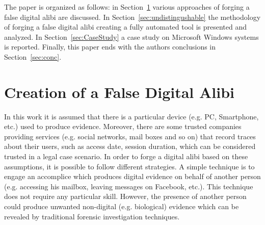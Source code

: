 \documentclass[runningheads]{llncs}
\begin{document}
The paper is organized as follows:
in Section~\ref{sec:creation} various approaches of forging a false digital alibi are discussed.
In Section~\ref{sec:undistingushable} the methodology of forging a false digital alibi creating a fully automated tool is presented and analyzed.
In Section~\ref{sec:CaseStudy} a case study on Microsoft Windows systems is reported.
Finally, this paper ends with the authors conclusions in Section~\ref{sec:conc}.

\section{Creation of a False Digital Alibi}
\label{sec:creation}
In this work it is assumed that there is a particular device (e.g. PC, Smartphone, etc.) used to produce evidence. Moreover, there are some trusted companies providing services (e.g. social networks, mail boxes and so on) that record traces about their users, such as access date, session duration, which can be considered trusted in a legal case scenario.
In order to forge a digital alibi based on these assumptions, it is possible to follow different strategies.
A simple technique is to engage an accomplice which produces digital evidence on behalf of another person (e.g. accessing his mailbox, leaving messages on Facebook, etc.). This technique does not require any particular skill. However, the presence of another person could produce unwanted non-digital (e.g. biological) evidence which can be revealed by traditional forensic investigation techniques.
\end{document}
